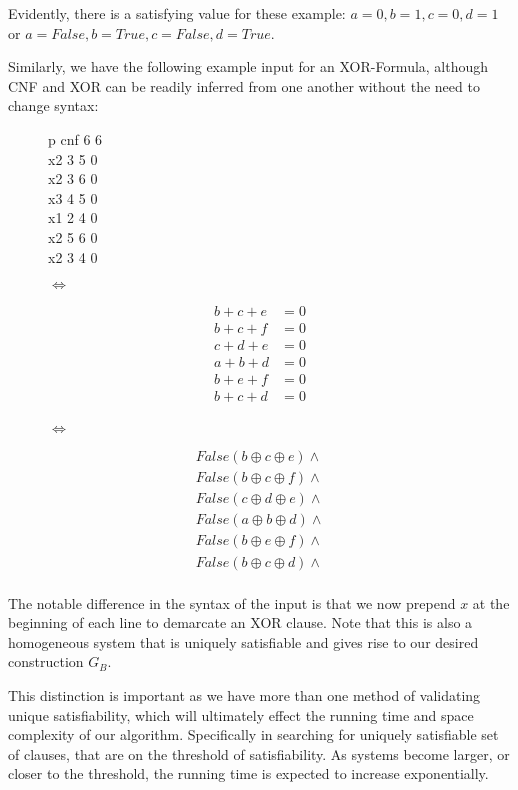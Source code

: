 Evidently, there is a satisfying value for these example: $a=0, b=1, c=0, d=1$ or $a=False, b=True, c=False, d=True$.
\par
Similarly, we have the following example input for an XOR-Formula, although CNF and XOR can be readily inferred from one another without the need to change syntax:
\begin{figure}[htbp!]
	\centering
	\begin{minipage}{.2\textwidth}
		p cnf 6 6 \\
		x2 3 5 0 \\
		x2 3 6 0 \\
		x3 4 5 0 \\
		x1 2 4 0 \\
		x2 5 6 0 \\
		x2 3 4 0 \\
	\end{minipage}
	$\iff$
	\begin{minipage}{.2\textwidth}
		\begin{align*}
			b + c + e &= 0 \\
			b + c + f &= 0 \\
			c + d + e &= 0 \\
			a + b + d &= 0 \\
			b + e + f &= 0 \\
			b + c + d &= 0 \\
		\end{align*}
	\end{minipage}
	$\iff$
	\begin{minipage}{.2\textwidth}
		\begin{align*}
			False(b \oplus c \oplus e) \land \\
			False(b \oplus c \oplus f) \land \\
			False(c \oplus d \oplus e) \land \\
			False(a \oplus b \oplus d) \land \\
			False(b \oplus e \oplus f) \land \\
			False(b \oplus c \oplus d) \land \\
		\end{align*}    
	\end{minipage}
\end{figure}

The notable difference in the syntax of the input is that we now prepend $x$ at the beginning of each line to demarcate an XOR clause. Note that this is also a homogeneous system that is uniquely satisfiable and gives rise to our desired construction $G_B$.
\par
This distinction is important as we have more than one method of validating unique satisfiability, which will ultimately effect the running time and space complexity of our algorithm. Specifically in searching for uniquely satisfiable set of clauses, that are on the threshold of satisfiability. As systems become larger, or closer to the threshold, the running time is expected to increase exponentially.

